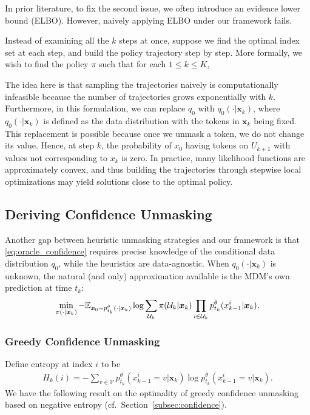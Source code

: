 In prior literature, to fix the second issue, we often introduce an evidence lower bound (ELBO). However, naively applying ELBO under our framework fails.

Instead of examining all the $k$ steps at once, suppose we find the optimal index set at each step, and build the policy trajectory step by step. More formally, we wish to find the policy $\pi$ such that for each $1 \leq k \leq  K$,


The idea here is that sampling the trajectories naively is computationally infeasible because the number of trajectories grows exponentially with $k$. Furthermore, in this formulation, we can replace $q_0$ with $q_0(\cdot | \bm x_k)$, where $q_0(\cdot | \bm x_k)$ is defined as the data distribution with the tokens in $\bm x_k$ being fixed. This replacement is possible because once we unmask a token, we do not change its value. Hence, at step $k$, the probability of $x_0$ having tokens on $U_{k+1}$ with values not corresponding to $x_k$ is zero. In practice, many likelihood functions are approximately convex, and thus building the trajectories through stepwise local optimizations may yield solutions close to the optimal policy. 
\fi

\subsection{Deriving Confidence Unmasking}
Another gap between heuristic unmasking strategies and our framework is that \eqref{eq:oracle_confidence} requires precise knowledge of the conditional data distribution $q_0$, while the heuristics are data-agnostic. When $q_0(\cdot|\bm x_k)$ is unknown, the natural (and only) approximation available is the MDM's own prediction at time $t_k$:
\begin{align}
    \label{eq:trainable_confidence}
         \min_{\pi(\cdot|\bm x_k)} -\mathbb{E}_{\bm x_0\sim p^\theta_{t_k}(\cdot|\bm x_k)}\log\sum_{\mathcal U_k} \pi(\mathcal U_k|\bm x_k) \prod_{i\in\mathcal U_k}p^\theta_{t_k}(x_{k-1}^i|\bm x_k).
\end{align}

\subsubsection{Greedy Confidence Unmasking}
Define entropy at index $i$ to be
\begin{align*}
 H_k(i)=-\sum_{v\in\mathcal V} p^\theta_{t_k}(x^i_{k-1}=v|\bm x_k)\log p^\theta_{t_k}(x^i_{k-1}=v|\bm x_k).
\end{align*}
We have the following result on the optimality of greedy confidence unmasking based on negative entropy (cf.~Section~\ref{subsec:confidence}).

